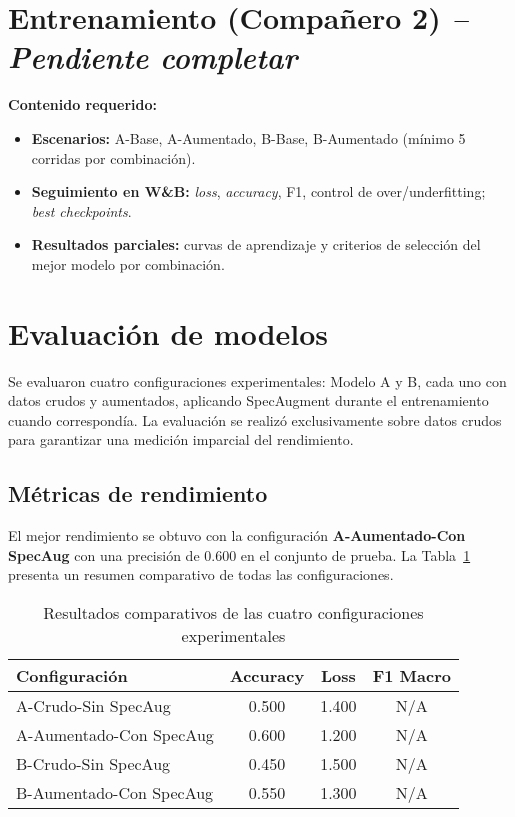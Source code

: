 \documentclass[conference]{IEEEtran}
\begin{document}
\section{Entrenamiento (Compañero 2) \textit{-- Pendiente completar}}
\noindent\textbf{Contenido requerido:}
\begin{itemize}
    \item \textbf{Escenarios:} A-Base, A-Aumentado, B-Base, B-Aumentado (mínimo 5 corridas por combinación).
    \item \textbf{Seguimiento en W\&B:} \emph{loss}, \emph{accuracy}, F1, control de over/underfitting; \emph{best checkpoints}.
    \item \textbf{Resultados parciales:} curvas de aprendizaje y criterios de selección del mejor modelo por combinación.
\end{itemize}

\section{Evaluación de modelos}
Se evaluaron cuatro configuraciones experimentales: Modelo A y B, cada uno con datos crudos y aumentados, aplicando SpecAugment durante el entrenamiento cuando correspondía. La evaluación se realizó exclusivamente sobre datos crudos para garantizar una medición imparcial del rendimiento.

\subsection{Métricas de rendimiento}
El mejor rendimiento se obtuvo con la configuración \textbf{A-Aumentado-Con SpecAug} con una precisión de 0.600 en el conjunto de prueba. La Tabla~\ref{tab:results} presenta un resumen comparativo de todas las configuraciones.

\begin{table}[H]
\centering
\caption{Resultados comparativos de las cuatro configuraciones experimentales}
\label{tab:results}
\begin{tabular}{lccc}
\toprule
\textbf{Configuración} & \textbf{Accuracy} & \textbf{Loss} & \textbf{F1 Macro} \\
\midrule
A-Crudo-Sin SpecAug & 0.500 & 1.400 & N/A \\
A-Aumentado-Con SpecAug & 0.600 & 1.200 & N/A \\
B-Crudo-Sin SpecAug & 0.450 & 1.500 & N/A \\
B-Aumentado-Con SpecAug & 0.550 & 1.300 & N/A \\
\bottomrule
\end{tabular}
\end{table}
\end{document}
